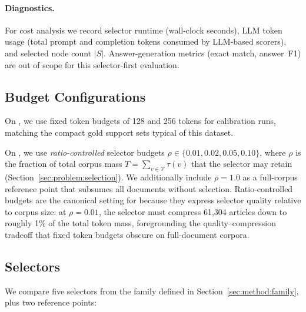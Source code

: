\paragraph{Diagnostics.}
For cost analysis we record selector runtime (wall-clock seconds),
LLM token usage (total prompt and completion tokens consumed by
LLM-based scorers), and selected node count $|S|$.
Answer-generation metrics (exact match, answer~F1) are out of scope for this
selector-first evaluation.

\subsection{Budget Configurations}
\label{sec:setup:budgets}

On \TwoWiki, we use fixed token budgets of 128 and 256 tokens for
calibration runs, matching the compact gold support sets typical of this
dataset.

On \IIRC, we use \emph{ratio-controlled} selector budgets
$\rho \in \{0.01, 0.02, 0.05, 0.10\}$, where $\rho$ is the fraction of
total corpus mass $T = \sum_{v \in \mathcal{V}} \tau(v)$ that the selector
may retain (Section~\ref{sec:problem:selection}).
We additionally include $\rho = 1.0$ as a full-corpus reference point
that subsumes all documents without selection.
Ratio-controlled budgets are the canonical setting for \IIRC because they
express selector quality relative to corpus size: at $\rho = 0.01$, the
selector must compress 61{,}304 articles down to roughly 1\% of the total
token mass, foregrounding the quality--compression tradeoff that fixed
token budgets obscure on full-document corpora.

\subsection{Selectors}
\label{sec:setup:selectors}

We compare five selectors from the family defined in
Section~\ref{sec:method:family}, plus two reference points:

